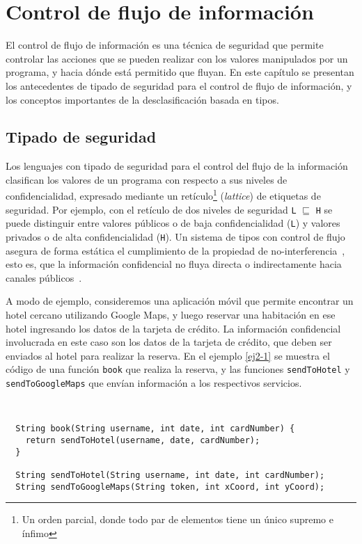 \chapter{Control de flujo de información} \label{controlflujo}
El control de flujo de información es una técnica de seguridad que permite controlar las acciones que se pueden realizar con los valores manipulados por un programa, y hacia dónde está permitido que fluyan. En este capítulo se presentan los antecedentes de tipado de seguridad para el control de flujo de información, y los conceptos importantes de la desclasificación basada en tipos.

\section{Tipado de seguridad}
Los lenguajes con tipado de seguridad para el control del flujo de la información clasifican los valores de un programa con respecto a sus niveles de confidencialidad, expresado mediante un retículo\footnote{Un orden parcial, donde todo par de elementos tiene un único supremo e ínfimo} (\emph{lattice}) de etiquetas de seguridad. Por ejemplo, con el retículo de dos niveles de seguridad \texttt{L} $\sqsubseteq$ \texttt{H} se puede distinguir entre valores públicos o de baja confidencialidad (\texttt{L}) y valores privados o de alta confidencialidad (\texttt{H}). Un sistema de tipos con control de flujo asegura de forma estática el cumplimiento de la propiedad de no-interferencia~\cite{noninterference}, esto es, que la información confidencial no fluya directa o indirectamente hacia canales públicos~\cite{volpanoAl:S96}.

A modo de ejemplo, consideremos una aplicación móvil que permite encontrar un hotel cercano utilizando Google Maps, y luego reservar una habitación en ese hotel ingresando los datos de la tarjeta de crédito. La información confidencial involucrada en este caso son los datos de la tarjeta de crédito, que deben ser enviados al hotel para realizar la reserva. En el ejemplo \ref{ej2-1} se muestra el código de una función \texttt{book} que realiza la reserva, y las funciones \texttt{sendToHotel} y \texttt{sendToGoogleMaps} que envían información a los respectivos servicios.
\clearpage
\begin{ej} \ \\
  \normalfont
  \label{ej2-1}
\begin{lstlisting}
  String book(String username, int date, int cardNumber) {
    return sendToHotel(username, date, cardNumber);
  }

  String sendToHotel(String username, int date, int cardNumber);
  String sendToGoogleMaps(String token, int xCoord, int yCoord);
\end{lstlisting}
\end{ej}


